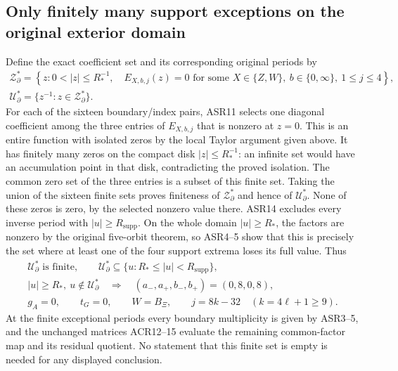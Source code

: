 \documentclass[11pt,a4paper]{article}
\begin{document}
\subsection{Only finitely many support exceptions on the original exterior domain}
Define the exact coefficient set and its corresponding original periods by
\[
\begin{gathered}
 \mathcal Z_{\partial}^{*}=
 \left\{z:0<|z|\le R_*^{-1},\quad
 E_{X,b,j}(z)=0\text{ for some }X\in\{Z,W\},\
 b\in\{0,\infty\},\ 1\le j\le4\right\},\\
 \mathcal U_{\partial}^{*}=\{z^{-1}:z\in\mathcal Z_{\partial}^{*}\}.
\end{gathered}
\]
For each of the sixteen boundary/index pairs, ASR11 selects one
diagonal coefficient among the three entries of $E_{X,b,j}$ that is
nonzero at $z=0$. This is an entire function with isolated zeros by
the local Taylor argument given above. It has finitely many zeros
on the compact disk $|z|\le R_*^{-1}$: an infinite set would have an
accumulation point in that disk, contradicting the proved isolation.
The common zero set of the three entries is a subset of this finite
set. Taking the union of the sixteen finite sets proves finiteness
of $\mathcal Z_{\partial}^{*}$ and hence of $\mathcal U_{\partial}^{*}$.
None of these zeros is zero, by the selected nonzero value there.
ASR14 excludes every inverse period with $|u|\ge R_{\mathrm{supp}}$.
On the whole domain $|u|\ge R_*$, the factors are nonzero by the
original five-orbit theorem, so ASR4--5 show that this is precisely
the set where at least one of the four support extrema loses its
full value. Thus
\[
\boxed{\begin{gathered}
 \mathcal U_{\partial}^{*}\text{ is finite},\qquad
 \mathcal U_{\partial}^{*}\subseteq
       \{u:R_*\le|u|<R_{\mathrm{supp}}\},\\
 |u|\ge R_*,\ u\notin\mathcal U_{\partial}^{*}
 \quad\Longrightarrow\quad
 (a_-,a_+,b_-,b_+)=(0,8,0,8),\\
 g_A=0,\qquad t_G=0,\qquad W=B_\Xi,\qquad j=8k-32
 \quad(k=4\ell+1\ge9).
\end{gathered}}\tag{ASR18}
\]
At the finite exceptional periods every boundary multiplicity is
given by ASR3--5, and the unchanged matrices ACR12--15 evaluate the
remaining common-factor map and its residual quotient. No statement
that this finite set is empty is needed for any displayed conclusion.


\clearpage
\end{document}
